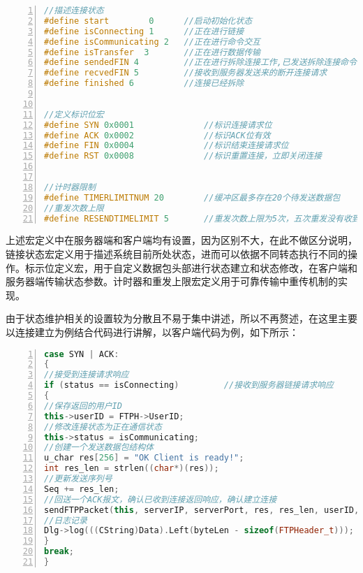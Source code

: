 \documentclass[lang=cn,11pt]{elegantpaper}
\begin{document}
\begin{lstlisting}[language = C++, numbers=left, 
numberstyle=\tiny,keywordstyle=\color{blue!70},
commentstyle=\color{red!50!green!50!blue!50},frame=shadowbox,
rulesepcolor=\color{red!20!green!20!blue!20},basicstyle=\ttfamily]
//描述连接状态
#define start        0		//启动初始化状态
#define isConnecting 1		//正在进行链接
#define isCommunicating 2	//正在进行命令交互
#define isTransfer	3		//正在进行数据传输
#define sendedFIN 4			//正在进行拆除连接工作,已发送拆除连接命令
#define recvedFIN 5			//接收到服务器发送来的断开连接请求
#define finished 6			//连接已经拆除


//定义标识位宏
#define SYN 0x0001				//标识连接请求位
#define ACK 0x0002				//标识ACK位有效
#define FIN 0x0004				//标识结束连接请求位
#define RST 0x0008				//标识重置连接，立即关闭连接


//计时器限制
#define TIMERLIMITNUM 20        //缓冲区最多存在20个待发送数据包
//重发次数上限
#define RESENDTIMELIMIT 5		//重发次数上限为5次，五次重发没有收到响应，进行报错

\end{lstlisting}

上述宏定义中在服务器端和客户端均有设置，因为区别不大，在此不做区分说明，链接状态宏定义用于描述系统目前所处状态，进而可以依据不同转态执行不同的操作。标示位定义宏，用于自定义数据包头部进行状态建立和状态修改，在客户端和服务器端传输状态参数。计时器和重发上限宏定义用于可靠传输中重传机制的实现。

由于状态维护相关的设置较为分散且不易于集中讲述，所以不再赘述，在这里主要以连接建立为例结合代码进行讲解，以客户端代码为例，如下所示：

\begin{lstlisting}[language = C++, numbers=left, 
numberstyle=\tiny,keywordstyle=\color{blue!70},
commentstyle=\color{red!50!green!50!blue!50},frame=shadowbox,
rulesepcolor=\color{red!20!green!20!blue!20},basicstyle=\ttfamily]
case SYN | ACK:
{
//接受到连接请求响应
if (status == isConnecting)			//接收到服务器链接请求响应
{
//保存返回的用户ID
this->userID = FTPH->UserID;
//修改连接状态为正在通信状态
this->status = isCommunicating;
//创建一个发送数据包结构体
u_char res[256] = "OK Client is ready!";
int res_len = strlen((char*)(res));
//更新发送序列号
Seq += res_len;
//回送一个ACK报文，确认已收到连接返回响应，确认建立连接
sendFTPPacket(this, serverIP, serverPort, res, res_len, userID, 0, Seq, Ack, ACK);
//日志记录 
Dlg->log(((CString)Data).Left(byteLen - sizeof(FTPHeader_t)));
}
break;
}
\end{lstlisting}
\end{document}
